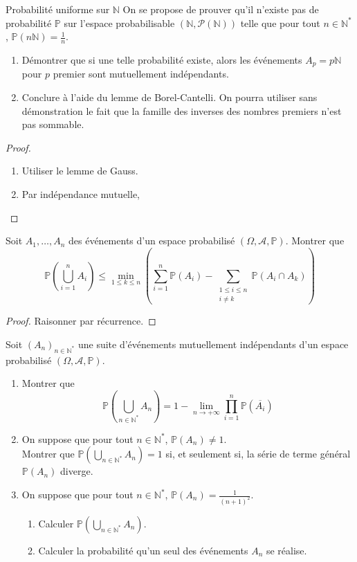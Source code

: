 \documentclass[french,a4paper]{article}
\renewcommand{\P}{\mathbb{P}}
\newcommand{\N}{\mathbb{N}}
\newcommand{\st}{^*}
\theoremstyle{plain}
\theoremstyle{definition}
\theoremstyle{remark}
\begin{document}
\begin{ex}[Châteaux]{Probabilité uniforme sur $\N$}
	On se propose de prouver qu'il n'existe pas de probabilité $\P$ sur l'espace probabilisable $(\N,\mathcal{P}(\N))$ telle que pour tout $n\in\N\st$, $\P(n\N)=\displaystyle\frac{1}{n}$.
	\begin{enumerate}
		\item Démontrer que si une telle probabilité existe, alors les événements $A_p=p\N$ pour $p$ premier sont mutuellement indépendants.
		\item Conclure à l'aide du lemme de Borel-Cantelli. On pourra utiliser sans démonstration le fait que la famille des inverses des nombres premiers n'est pas sommable.
	\end{enumerate}
\end{ex}
\begin{proof}
	\begin{enumerate}
		\item Utiliser le lemme de Gauss.
		\item Par indépendance mutuelle,
	\end{enumerate}
\end{proof}

\begin{ex}{}
	Soit $A_1,\ldots, A_n$ des événements d'un espace probabilisé $(\Omega,\mathcal{A},\P)$. Montrer que $$\P\left(\bigcup_{i=1}^nA_i\right)\leqslant\underset{1\leqslant k\leqslant n}{\min}\left(\sum_{i=1}^{n}\P(A_i)-\sum_{\substack{1\leqslant i\leqslant n \\ i\ne k}}\P(A_i\cap A_k)\right)$$
\end{ex}
\begin{proof}
	Raisonner par récurrence.
\end{proof}

\begin{ex}{}
	Soit $(A_n)_{n\in\N\st}$ une suite d'événements mutuellement indépendants d'un espace probabilisé $(\Omega,\mathcal{A},\P)$.
	\begin{enumerate}
		\item Montrer que $$\P\left(\bigcup_{n\in\N\st}A_n\right)=1-\underset{n\to+\infty}{\lim}\prod_{i=1}^{n}\P(\overline{A_i})$$
		\item On suppose que pour tout $n\in\N\st$, $\P(A_n)\ne 1$. \\ Montrer que $\displaystyle\P\left(\bigcup_{n\in\N\st}A_n\right)=1$ si, et seulement si, la série de terme général $\P(A_n)$ diverge.
		\item On suppose que pour tout $n\in\N\st$, $\P(A_n)=\displaystyle\frac{1}{(n+1)^2}$.
		\begin{enumerate}[label=\alph*.]
			\item Calculer $\displaystyle\P\left(\bigcup_{n\in\N\st}A_n\right)$.
			\item Calculer la probabilité qu'un seul des événements $A_n$ se réalise.
		\end{enumerate}
	\end{enumerate}
\end{ex}
\end{document}
